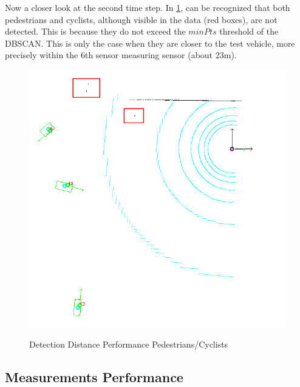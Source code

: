 \documentclass[11pt,oneside,openright]{mpreport}
\begin{document}
Now a closer look at the second time step. In \cref{detection_performance2}, can be recognized that both pedestrians and cyclists, although visible in the data (red boxes), are not detected. 
This is because they do not exceed the $minPts$ threshold of the \ac{DBSCAN}. This is only the case when they are closer to the test vehicle, more precisely within the 6th sensor measuring sensor (about 23m).
\begin{figure}[!htb]
  \caption{Detection Distance Performance Pedestrians/Cyclists} 
  \centering
  \includegraphics[width=\textwidth]{bilder/alg/img100002_m_s.png}
 \label{detection_performance2}
\end{figure}



\subsection{Measurements Performance}

\end{document}
